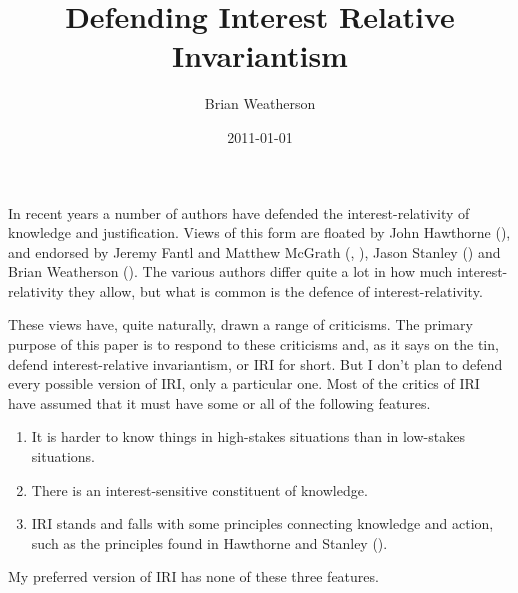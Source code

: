 \documentclass[
  11pt,
  letterpaper,
  DIV=11,
  numbers=noendperiod,
  oneside]{scrartcl}
\title{Defending Interest Relative Invariantism}
\author{Brian Weatherson}
\date{2011-01-01}
\providecommand{\tightlist}{%
  \setlength{\itemsep}{0pt}\setlength{\parskip}{0pt}}\usepackage{longtable,booktabs,array}
\begin{document}
\maketitle
In recent years a number of authors have defended the
interest-relativity of knowledge and justification. Views of this form
are floated by John Hawthorne (), and
endorsed by Jeremy Fantl and Matthew McGrath
(, ),
Jason Stanley () and Brian
Weatherson (). The various
authors differ quite a lot in how much interest-relativity they allow,
but what is common is the defence of interest-relativity.

These views have, quite naturally, drawn a range of criticisms. The
primary purpose of this paper is to respond to these criticisms and, as
it says on the tin, defend interest-relative invariantism, or IRI for
short. But I don't plan to defend every possible version of IRI, only a
particular one. Most of the critics of IRI have assumed that it must
have some or all of the following features.

\begin{enumerate}
\def\labelenumi{\arabic{enumi}.}
\tightlist
\item
  It is harder to know things in high-stakes situations than in
  low-stakes situations.
\item
  There is an interest-sensitive constituent of knowledge.
\item
  IRI stands and falls with some principles connecting knowledge and
  action, such as the principles found in Hawthorne and Stanley
  ().
\end{enumerate}

My preferred version of IRI has none of these three features.
\end{document}
